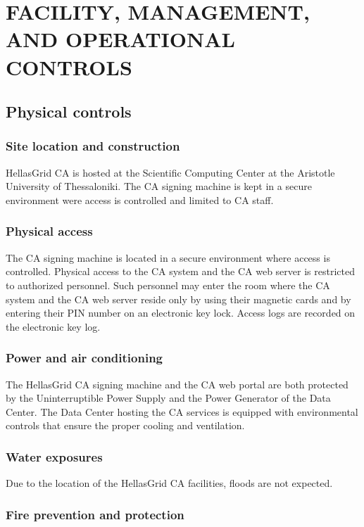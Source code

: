 
\chapter{FACILITY, MANAGEMENT, AND OPERATIONAL CONTROLS}
\section{Physical controls}
\subsection{Site location and construction}

HellasGrid CA is hosted at the Scientific Computing Center at the Aristotle University of Thessaloniki. The CA signing machine is kept in a secure environment were access is controlled and limited to CA staff. 


\subsection{Physical access}

The CA signing machine is located in a secure environment where access is controlled. Physical access to the CA system and the CA web server is restricted to authorized personnel. Such personnel may enter the room where the CA system and the CA web server reside only by using their magnetic cards and by entering their PIN number on an electronic key lock. Access logs are recorded on the electronic key log. 

\subsection{Power and air conditioning}

The HellasGrid CA signing machine and the CA web portal are both protected by the  Uninterruptible Power Supply and the Power Generator of the Data Center. The Data Center hosting the CA services is equipped with environmental controls that ensure the proper cooling and ventilation.

\subsection{Water exposures}

Due to the location of the HellasGrid CA facilities, floods are not expected.

\subsection{Fire prevention and protection}

